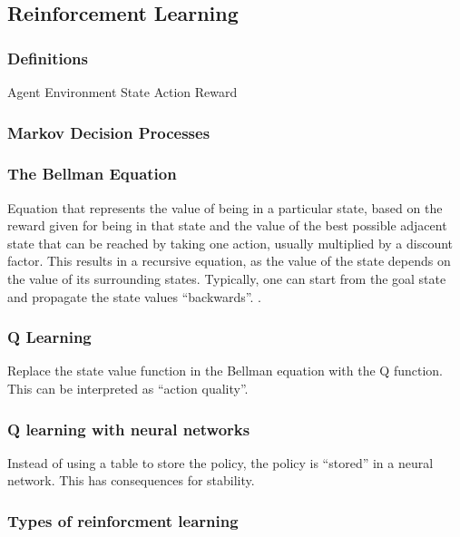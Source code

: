 \subsection{Reinforcement Learning}
\subsubsection{Definitions}
Agent
Environment
State
Action
Reward

\subsubsection{Markov Decision Processes}

\subsubsection{The Bellman Equation}
Equation that represents the value of being in a particular state,
based on the reward given for being in that state and the value of the
best possible adjacent state that can be reached by taking one action,
usually multiplied by a discount factor. This results in a recursive
equation, as the value of the state depends on the value of its
surrounding states. Typically, one can start from the goal state and
propagate the state values ``backwards''. .

\subsubsection{Q Learning}
Replace the state value function in the Bellman equation with the Q
function. This can be interpreted as ``action quality''.

\subsubsection{Q learning with neural networks}
Instead of using a table to store the policy, the policy is ``stored''
in a neural network. This has consequences for stability.

\subsubsection{Types of reinforcment learning}
\label{sec:learning-types}



